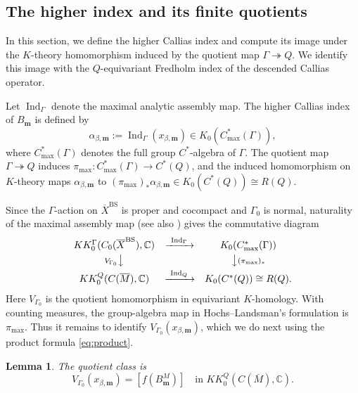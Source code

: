 \documentclass[11pt]{article}
\theoremstyle{definition}
\theoremstyle{plain}
\numberwithin{equation}{section}
\newtheorem{lemma}[theorem]{Lemma}
\newcommand{\BS}{\mathrm{BS}}
\newcommand{\Ind}{\operatorname{Ind}}
\begin{document}
\subsection{The higher index and its finite quotients}
\label{subsec:quotient}

In this section, we define the higher Callias index and compute
its image under the $K$-theory homomorphism induced by the
quotient map $\Gamma\twoheadrightarrow Q$.
We identify this image with the $Q$-equivariant Fredholm index
of the descended Callias operator.

Let $\Ind_\Gamma$ denote the maximal analytic assembly map.
The higher Callias index of $B_{\boldsymbol m}$ is defined by
\begin{equation}\label{eq:alpha}
 \alpha_{\beta,\boldsymbol m}
       :=\Ind_\Gamma(x_{\beta,\boldsymbol m})
          \in K_0(C^*_{\max}(\Gamma)),
\end{equation}
where $C^*_{\max}(\Gamma)$ denotes the full group $C^*$-algebra
of $\Gamma$.
The quotient map $\Gamma\twoheadrightarrow Q$ induces
$\pi_{\max}:C^*_{\max}(\Gamma)\to C^*(Q)$, 
and the induced homomorphism on $K$-theory maps
$\alpha_{\beta,\boldsymbol m}$ to
$(\pi_{\max})_*\alpha_{\beta,\boldsymbol m}
 \in K_0(C^*(Q))\cong R(Q)$.

Since the $\Gamma$-action on $\overline X^{\BS}$ is proper and cocompact
and $\Gamma_0$ is normal, naturality of the maximal assembly map
\cite{ValetteAssembly}
(see also \cite[Appendix~A, Theorem~A.1]{HochsLandsman})
gives the commutative diagram
\begin{equation}\label{eq:quotient-naturality}
\begin{array}{ccc}
 KK_0^\Gamma(C_0(\overline X^{\BS}),\mathbb C)
 &\xrightarrow{\ \Ind_\Gamma\ }&K_0(C^*_{\max}(\Gamma))
 \\[3pt]
 {\scriptstyle V_{\Gamma_0}}\big\downarrow
 &&\big\downarrow{\scriptstyle(\pi_{\max})_*}
 \\[3pt]
 KK_0^Q(C(\overline M),\mathbb C)
 &\xrightarrow{\ \Ind_Q\ }&K_0(C^*(Q))\cong R(Q).
\end{array}
\end{equation}
Here $V_{\Gamma_0}$ is the quotient homomorphism in equivariant
$K$-homology. With counting measures, the group-algebra map
in Hochs--Landsman's formulation is $\pi_{\max}$.
Thus it remains to identify
$V_{\Gamma_0}(x_{\beta,\boldsymbol m})$, which we do next
using the product formula \eqref{eq:product}.

\begin{lemma}\label{lem:quotient-class}
The quotient class is
\begin{equation}\label{eq:quotient-class}
 V_{\Gamma_0}(x_{\beta,\boldsymbol m})
    =[f(B_{\boldsymbol m}^M)]
    \quad\text{in }KK_0^Q(C(\overline M),\mathbb C).
\end{equation}
\end{lemma}
\end{document}
